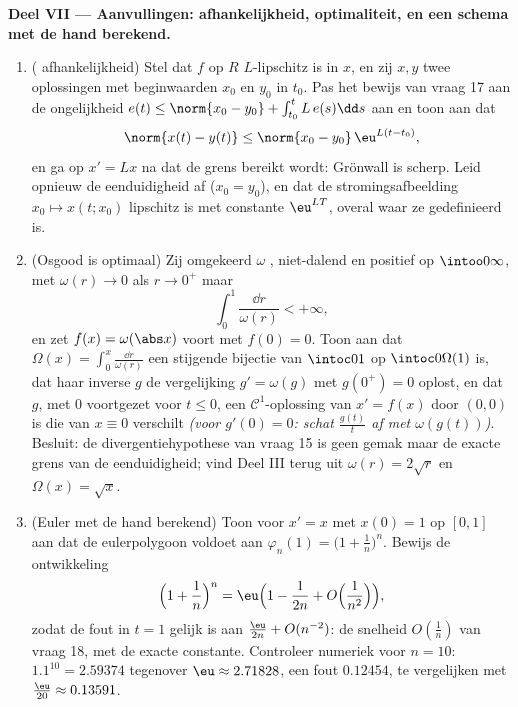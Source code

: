\begin{problem}[{Weekendopgave --- bestaan van oplossingen van $x'
= f(t, x)$ zonder Lipschitz}]
\medskip
\noindent\textbf{Deel VII --- Aanvullingen: afhankelijkheid,
optimaliteit, en een schema met de hand berekend.}
\begin{enumerate}[resume]
  \item ( afhankelijkheid) Stel dat $f$ op $R$
        $L$-lipschitz is in $x$, en zij $x, y$ twee oplossingen
        met beginwaarden $x_0$ en $y_0$ in $t_0$. Pas het bewijs
        van vraag 17 aan de ongelijkheid $e(t) \leq \norm{x_0 -
        y_0} + \int_{t_0}^tL\,e(s)\dd s$ aan en toon aan dat
        \[
        \norm{x(t) - y(t)} \leq \norm{x_0 - y_0}\,
        \eu^{L(t - t_0)},
        \]
        en ga op $x' = Lx$ na dat de grens bereikt wordt: Grönwall
        is scherp. Leid opnieuw de eenduidigheid af ($x_0 = y_0$),
        en dat de stromingsafbeelding $x_0 \mapsto x(t; x_0)$
        lipschitz is met constante $\eu^{LT}$, overal waar ze
        gedefinieerd is.
  \item (Osgood is optimaal) Zij omgekeerd $\omega$ ,
        niet-dalend en positief op $\intoo0\infty$, met $\omega(r)
        \to 0$ als $r \to 0^+$ maar
        \[
        \int_0^1\frac{\dd r}{\omega(r)} < +\infty,
        \]
        en zet $f(x) = \omega(\abs x)$ voort met $f(0) = 0$. Toon
        aan dat $\Omega(x) = \int_0^x\frac{\dd r}{\omega(r)}$ een
        stijgende bijectie van $\intoc0{1}$ op $\intoc0{\Omega(1)}$
        is, dat haar inverse $g$ de vergelijking $g' = \omega(g)$
        met $g(0^+) = 0$ oplost, en dat $g$, met $0$ voortgezet
        voor $t \leq 0$, een $\mathcal C^1$-oplossing van $x' =
        f(x)$ door $(0, 0)$ is die van $x \equiv 0$ verschilt
        \emph{(voor $g'(0) = 0$: schat $\frac{g(t)}t$ af met
        $\omega(g(t))$)}. Besluit: de divergentiehypothese van
        vraag 15 is geen gemak maar de exacte grens van de
        eenduidigheid; vind Deel III terug uit $\omega(r) = 2\sqrt
        r$ en $\Omega(x) = \sqrt x$.
  \item (Euler met de hand berekend) Toon voor $x' = x$ met $x(0)
        = 1$ op $[0, 1]$ aan dat de eulerpolygoon voldoet aan
        $\varphi_n(1) = \bigl(1 + \frac1n\bigr)^n$. Bewijs de
        ontwikkeling
        \[
        \Bigl(1 + \frac1n\Bigr)^{n}
        = \eu\Bigl(1 - \frac1{2n} + O\Bigl(\frac1{n^2}\Bigr)
        \Bigr),
        \]
        zodat de fout in $t = 1$ gelijk is aan $\frac{\eu}{2n} +
        O(n^{-2})$: de snelheid $O(\frac1n)$ van vraag 18, met de
        exacte constante. Controleer numeriek voor $n = 10$:
        $1.1^{10} = 2.59374$ tegenover $\eu \approx 2.71828$, een
        fout $0.12454$, te vergelijken met $\frac{\eu}{20} \approx
        0.13591$.
\end{enumerate}
\end{problem}
